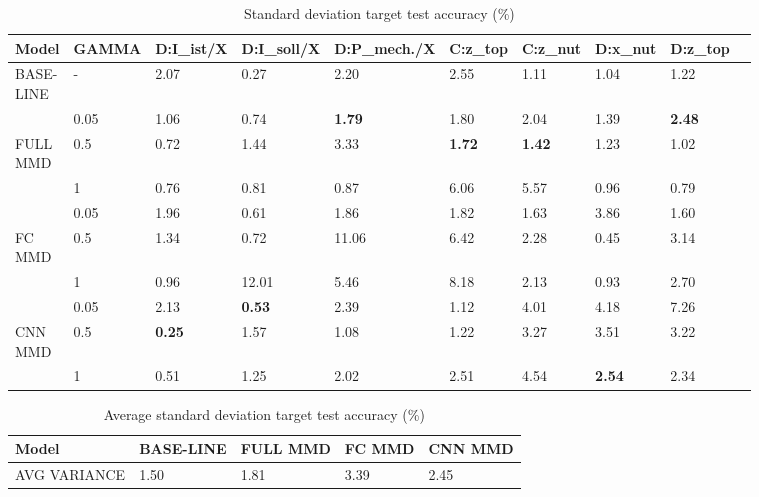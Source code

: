 \begin{sidewaystable}
\begin {table}[H]
\centering
\begin{tabular}{llllllllll}
  \toprule
  Model          & GAMMA    & D:I\_ist/X & D:I\_soll/X & D:P\_mech./X & C:z\_top & C:z\_nut & D:x\_nut & D:z\_top  \\
  \midrule

    \vspace{1cm}

    \thead{BASE- \\ LINE}   & -      & 2.07 & 0.27 & 2.20 & 2.55 & 1.11 & 1.04 & 1.22\\
 
                            & 0.05   & 1.06 & 0.74 & \textbf{1.79} & 1.80 & 2.04 & 1.39 & \textbf{2.48}\\
    \thead{FULL \\ MMD}     & 0.5    & 0.72 & 1.44 & 3.33 & \textbf{1.72} & \textbf{1.42} & 1.23 & 1.02\\
    
    \vspace{1cm}  
    
                            & 1      & 0.76 & 0.81 & 0.87 & 6.06 & 5.57 & 0.96 & 0.79\\



                            & 0.05   & 1.96 & 0.61 & 1.86 & 1.82 & 1.63 & 3.86 & 1.60\\
    \thead{FC \\ MMD}       & 0.5    & 1.34 & 0.72 & 11.06 & 6.42 & 2.28 & 0.45 & 3.14\\
    
    \vspace{1cm}
    
                            & 1      & 0.96 & 12.01 & 5.46 & 8.18 & 2.13 & 0.93 & 2.70\\
                            & 0.05   & 2.13 & \textbf{0.53} & 2.39 & 1.12 & 4.01 & 4.18 & 7.26\\
    \thead{CNN \\ MMD}      & 0.5    & \textbf{0.25} & 1.57 & 1.08 & 1.22 & 3.27 & 3.51 & 3.22\\
                            & 1      & 0.51 & 1.25 & 2.02 & 2.51 & 4.54 & \textbf{2.54} & 2.34\\
  \bottomrule
\end{tabular}
\caption {Standard deviation target test accuracy (\%)} \label{tab:Variance_Accuracy} 
\end {table}
\end{sidewaystable}


\begin {table}[H]
\centering
\begin{tabular}{lllll}
  \toprule
  Model & BASE-LINE & FULL MMD & FC MMD & CNN MMD\\
  \midrule
  AVG VARIANCE & 1.50 & 1.81 & 3.39 & 2.45\\
  \bottomrule
\end{tabular}
\caption {Average standard deviation target test accuracy (\%)} \label{tab:Average_Variance_Accuracy} 
\end {table}

